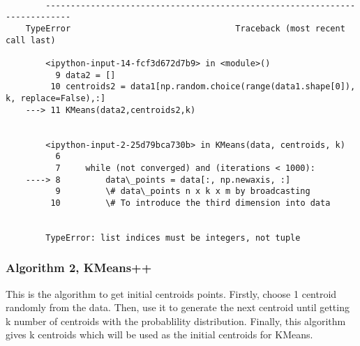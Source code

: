\documentclass{article}
\begin{document}
    \begin{Verbatim}[commandchars=\\\{\}]

        ---------------------------------------------------------------------------
    TypeError                                 Traceback (most recent call last)

        <ipython-input-14-fcf3d672d7b9> in <module>()
          9 data2 = []
         10 centroids2 = data1[np.random.choice(range(data1.shape[0]), k, replace=False),:]
    ---> 11 KMeans(data2,centroids2,k)
    

        <ipython-input-2-25d79bca730b> in KMeans(data, centroids, k)
          6 
          7     while (not converged) and (iterations < 1000):
    ----> 8         data\_points = data[:, np.newaxis, :]
          9         \# data\_points n x k x m by broadcasting
         10         \# To introduce the third dimension into data


        TypeError: list indices must be integers, not tuple

    \end{Verbatim}

    \subsubsection{\textbf{Algorithm 2, KMeans++}}\label{algorithm-2-kmeans}

This is the algorithm to get initial centroids points. Firstly, choose 1
centroid randomly from the data. Then, use it to generate the next
centroid until getting k number of centroids with the probablility
distribution. Finally, this algorithm gives k centroids which will be
used as the initial centroids for KMeans.
\end{document}
